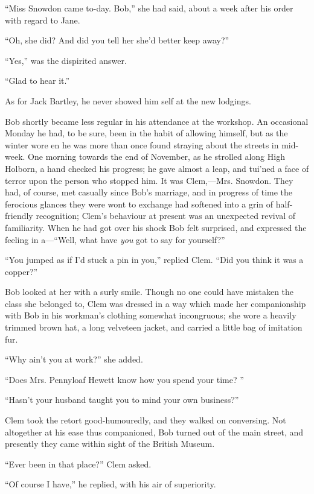 ``Miss Snowdon came to-day. Bob,'' she had said, about a week after his
order with regard to Jane.

``Oh, she did? And did you tell her she'd better keep away?''

``Yes,'' was the dispirited answer.

{}``Glad to hear it.''

As for Jack Bartley, he never showed him self at the new lodgings.

Bob shortly became less regular in his attendance at the workshop. An
occasional Monday he had, to be sure, been in the habit of allowing
himself, but as the winter wore en he was more than once found straying
about the streets in mid-week. One morning towards the end of November,
as he strolled along High Holborn, a hand checked his progress; he gave
almost a leap, and tui'ned a face of terror upon the person who stopped
him. It was Clem,---Mrs. Snowdon. They had, of course, met casually
since Bob's marriage, and in progress of time the ferocious glances they
were wont to exchange had softened into a grin of half-friendly
recognition; Clem's behaviour at present was an unexpected revival of
familiarity. When he had got over his shock Bob felt surprised, and
expressed the feeling in a---``Well, what have \emph{you} got to say for
yourself?''

``You jumped as if I'd stuck a pin in you,'' {}replied Clem. ``Did you
think it was a copper?''

Bob looked at her with a surly smile. Though no one could have mistaken
the class she belonged to, Clem was dressed in a way which made her
companionship with Bob in his workman's clothing somewhat incongruous;
she wore a heavily trimmed brown hat, a long velveteen jacket, and
carried a little bag of imitation fur.

``Why ain't you at work?'' she added.

``Does Mrs. Pennyloaf Hewett know how you spend your time? ''

``Hasn't your husband taught you to mind your own business?''

Clem took the retort good-humouredly, and they walked on conversing. Not
altogether at his ease thus companioned, Bob turned out of the main
street, and presently they came within sight of the British Museum.

``Ever been in that place?'' Clem asked.

``Of course I have,'' he replied, with his air of superiority.

